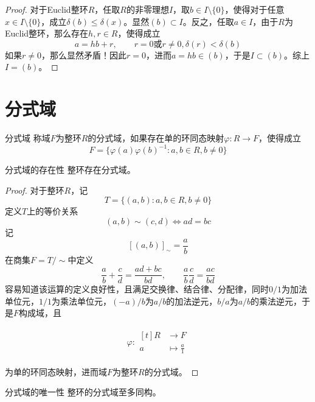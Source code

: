 \documentclass[lang = cn, scheme = chinese, thmcnt = section]{elegantbook}
\newcommand{\sub}{\subset}             %
\newcommand{\function}[5]{
	\begin{align*}
		#1:\begin{aligned}[t]
			#2 &\longrightarrow #3\\
			#4 &\longmapsto #5
		\end{aligned}
	\end{align*}
}                                     %
\begin{document}
\begin{proof}
	对于Euclid整环$R$，任取$R$的非零理想$I$，取$b\in I\setminus\{0\}$，使得对于任意$x\in I\setminus\{0\}$，成立$\delta(b)\le\delta(x)$。显然$(b)\sub I$。反之，任取$a\in I$，由于$R$为Euclid整环，那么存在$h,r\in R$，使得成立
	$$
	a=hb+r,\qquad r=0\text{或}r\ne 0,\delta(r)<\delta(b)
	$$
	如果$r\ne 0$，那么显然矛盾！因此$r=0$，进而$a=hb\in (b)$，于是$I\subset (b)$。综上$I=(b)$。
\end{proof}

\section{分式域}

\begin{definition}{分式域}
	称域$F$为整环$R$的分式域，如果存在单的环同态映射$\varphi:R\to F$，使得成立
	$$
	F=\{ \varphi(a)\varphi(b)^{-1}:a,b\in R,b\ne 0 \}
	$$
\end{definition}

\begin{theorem}{分式域的存在性}
	整环存在分式域。
\end{theorem}

\begin{proof}
	对于整环$R$，记
	$$
	T=\{ (a,b):a,b\in R,b\ne 0 \}
	$$
	定义$T$上的等价关系
	$$
	(a,b)\sim (c,d)\iff ad=bc
	$$
	记
	$$
	[(a,b)]_{\sim}=\frac{a}{b}
	$$
	在商集$F=T/\sim$中定义
	$$
	\frac{a}{b}+\frac{c}{d}=\frac{ad+bc}{bd},\qquad 
	\frac{a}{b}\frac{c}{d}=\frac{ac}{bd}
	$$
	容易知道该运算的定义良好性，且满足交换律、结合律、分配律，同时$0/1$为加法单位元，$1/1$为乘法单位元，$(-a)/b$为$a/b$的加法逆元，$b/a$为$a/b$的乘法逆元，于是$F$构成域，且
	\function{\varphi}{R}{F}{a}{\frac{a}{1}}
	为单的环同态映射，进而域$F$为整环$R$的分式域。
\end{proof}

\begin{theorem}{分式域的唯一性}
	整环的分式域至多同构。
\end{theorem}
\end{document}
